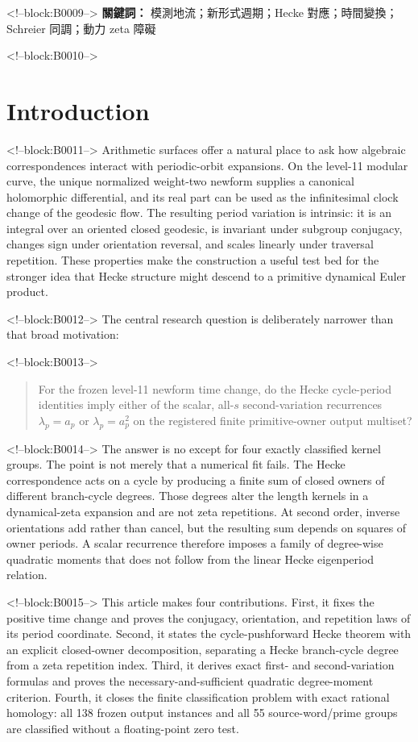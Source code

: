 \documentclass[11pt]{article}
\theoremstyle{definition}
\theoremstyle{remark}
\begin{document}
<!--block:B0009-->
\medskip
\noindent\textbf{關鍵詞：} 模測地流；新形式週期；Hecke 對應；時間變換；Schreier 同調；動力 zeta 障礙

<!--block:B0010-->
\section{Introduction}

<!--block:B0011-->
Arithmetic surfaces offer a natural place to ask how algebraic correspondences interact with periodic-orbit expansions. On the level-11 modular curve, the unique normalized weight-two newform supplies a canonical holomorphic differential, and its real part can be used as the infinitesimal clock change of the geodesic flow. The resulting period variation is intrinsic: it is an integral over an oriented closed geodesic, is invariant under subgroup conjugacy, changes sign under orientation reversal, and scales linearly under traversal repetition. These properties make the construction a useful test bed for the stronger idea that Hecke structure might descend to a primitive dynamical Euler product.

<!--block:B0012-->
The central research question is deliberately narrower than that broad motivation:

<!--block:B0013-->
\begin{quote}
For the frozen level-11 newform time change, do the Hecke cycle-period identities imply either of the scalar, all-$s$ second-variation recurrences $\lambda_p=a_p$ or $\lambda_p=a_p^2$ on the registered finite primitive-owner output multiset?
\end{quote}

<!--block:B0014-->
The answer is no except for four exactly classified kernel groups. The point is not merely that a numerical fit fails. The Hecke correspondence acts on a cycle by producing a finite sum of closed owners of different branch-cycle degrees. Those degrees alter the length kernels in a dynamical-zeta expansion and are not zeta repetitions. At second order, inverse orientations add rather than cancel, but the resulting sum depends on squares of owner periods. A scalar recurrence therefore imposes a family of degree-wise quadratic moments that does not follow from the linear Hecke eigenperiod relation.

<!--block:B0015-->
This article makes four contributions. First, it fixes the positive time change and proves the conjugacy, orientation, and repetition laws of its period coordinate. Second, it states the cycle-pushforward Hecke theorem with an explicit closed-owner decomposition, separating a Hecke branch-cycle degree from a zeta repetition index. Third, it derives exact first- and second-variation formulas and proves the necessary-and-sufficient quadratic degree-moment criterion. Fourth, it closes the finite classification problem with exact rational homology: all 138 frozen output instances and all 55 source-word/prime groups are classified without a floating-point zero test.
\end{document}
